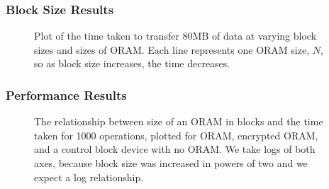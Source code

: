 \documentclass{beamer}
\begin{document}
\begin{frame}
    \frametitle{Block Size Results}
    \begin{figure}
    \centering
    \scalebox{0.6}{}
    \caption{Plot of the time taken to transfer 80MB of data at varying block sizes and sizes of ORAM. Each line represents one ORAM size, $N$, so as block size increases, the time decreases.}
    \label{fig:blockSizeResults}
    \end{figure}
\end{frame}


\begin{frame}
    \frametitle{Performance Results}
    \begin{figure}
    \centering
    \scalebox{0.5}{}
    \caption{The relationship between size of an ORAM in blocks and the time taken for 1000 operations, plotted for ORAM, encrypted ORAM, and a control block device with no ORAM. We take logs of both axes, because block size was increased in powers of two and we expect a log relationship.}
    \label{fig:timeResults}
    \end{figure}
\end{frame}
\end{document}
